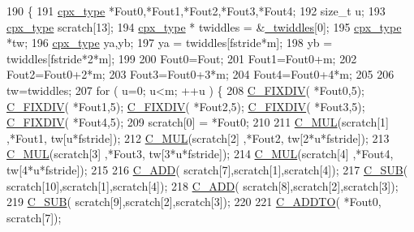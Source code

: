 \begin{DoxyCode}
190         \{
191             \hyperlink{classkissfft_af66664488b0b1b2995f3e4c2f63a8b7d}{cpx\_type} *Fout0,*Fout1,*Fout2,*Fout3,*Fout4;
192             \textcolor{keywordtype}{size\_t} u;
193             \hyperlink{classkissfft_af66664488b0b1b2995f3e4c2f63a8b7d}{cpx\_type} scratch[13];
194             \hyperlink{classkissfft_af66664488b0b1b2995f3e4c2f63a8b7d}{cpx\_type} * twiddles = &\hyperlink{classkissfft_abd5d6e3a0d08f56c711590d890fdd740}{\_twiddles}[0];
195             \hyperlink{classkissfft_af66664488b0b1b2995f3e4c2f63a8b7d}{cpx\_type} *tw;
196             \hyperlink{classkissfft_af66664488b0b1b2995f3e4c2f63a8b7d}{cpx\_type} ya,yb;
197             ya = twiddles[fstride*m];
198             yb = twiddles[fstride*2*m];
199 
200             Fout0=Fout;
201             Fout1=Fout0+m;
202             Fout2=Fout0+2*m;
203             Fout3=Fout0+3*m;
204             Fout4=Fout0+4*m;
205 
206             tw=twiddles;
207             \textcolor{keywordflow}{for} ( u=0; u<m; ++u ) \{
208                 \hyperlink{classkissfft_aef8eb1d4326ae5c6a94ad71af0af87c5}{C\_FIXDIV}( *Fout0,5); \hyperlink{classkissfft_aef8eb1d4326ae5c6a94ad71af0af87c5}{C\_FIXDIV}( *Fout1,5); 
      \hyperlink{classkissfft_aef8eb1d4326ae5c6a94ad71af0af87c5}{C\_FIXDIV}( *Fout2,5); \hyperlink{classkissfft_aef8eb1d4326ae5c6a94ad71af0af87c5}{C\_FIXDIV}( *Fout3,5); \hyperlink{classkissfft_aef8eb1d4326ae5c6a94ad71af0af87c5}{C\_FIXDIV}( *Fout4,5);
209                 scratch[0] = *Fout0;
210 
211                 \hyperlink{classkissfft_afa4efc3959abe6bb1e4c10f4442fed07}{C\_MUL}(scratch[1] ,*Fout1, tw[u*fstride]);
212                 \hyperlink{classkissfft_afa4efc3959abe6bb1e4c10f4442fed07}{C\_MUL}(scratch[2] ,*Fout2, tw[2*u*fstride]);
213                 \hyperlink{classkissfft_afa4efc3959abe6bb1e4c10f4442fed07}{C\_MUL}(scratch[3] ,*Fout3, tw[3*u*fstride]);
214                 \hyperlink{classkissfft_afa4efc3959abe6bb1e4c10f4442fed07}{C\_MUL}(scratch[4] ,*Fout4, tw[4*u*fstride]);
215 
216                 \hyperlink{classkissfft_a4f053d9dbac7e4c7c8594b01eca50511}{C\_ADD}( scratch[7],scratch[1],scratch[4]);
217                 \hyperlink{classkissfft_a1f4a4ec1b1ac1f2b199710b921b53a6d}{C\_SUB}( scratch[10],scratch[1],scratch[4]);
218                 \hyperlink{classkissfft_a4f053d9dbac7e4c7c8594b01eca50511}{C\_ADD}( scratch[8],scratch[2],scratch[3]);
219                 \hyperlink{classkissfft_a1f4a4ec1b1ac1f2b199710b921b53a6d}{C\_SUB}( scratch[9],scratch[2],scratch[3]);
220 
221                 \hyperlink{classkissfft_a1cb327491bc3dce979631f5c2ebd142a}{C\_ADDTO}( *Fout0, scratch[7]);

\end{DoxyCode}
